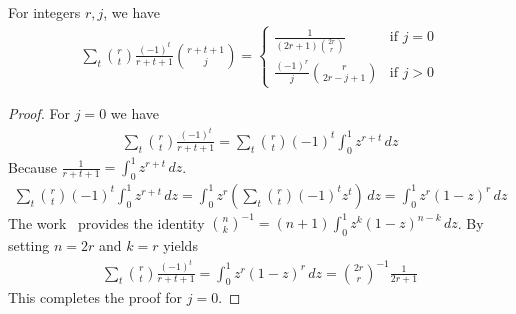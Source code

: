 \begin{lemma}
    \label{lem:piecewise-binomial-identity}
    For integers $r, j$, we have
    \begin{align*}
        \sum_{t} \binom{r}{t} \frac{(-1)^t}{r+t+1} \binom{r+t+1}{j}
        = \begin{cases}
              \displaystyle \frac{1}{(2r+1) \binom{2r}{r}} & \text{if } j=0 \\[0.8em]
              \displaystyle \frac{(-1)^r}{j} \binom{r}{2r-j+1} & \text{if } j>0
        \end{cases}
    \end{align*}
    \begin{proof}
        For $j=0$ we have
        \begin{align*}
            \sum_t \binom{r}{t} \frac{(-1)^t}{r+t+1} = \sum_t \binom{r}{t} (-1)^t \int_0^1 z^{r+t} \, dz
        \end{align*}
        Because $\frac{1}{r+t+1} = \int_0^1 z^{r+t} \, dz$.
        \begin{align*}
            \sum_t \binom{r}{t} (-1)^t \int_0^1 z^{r+t} \, dz
            = \int_0^1 z^r \left( \sum_t \binom{r}{t} (-1)^t z^{t} \right) \, dz
            = \int_0^1 z^r (1 - z)^r \, dz
        \end{align*}
        The work~\cite{sury2004identities} provides the identity $\binom{n}{k}^{-1}=(n+1)\int_0^1 z^k(1-z)^{n-k}\,dz$.
        By setting $n=2r$ and $k=r$ yields
        \begin{align*}
            \sum_t \binom{r}{t} \frac{(-1)^t}{r+t+1} = \int_0^1 z^r (1-z)^{r}\,dz = \binom{2r}{r}^{-1} \frac{1}{2r+1}
        \end{align*}
        This completes the proof for $j=0$.


\end{proof}
\end{lemma}
